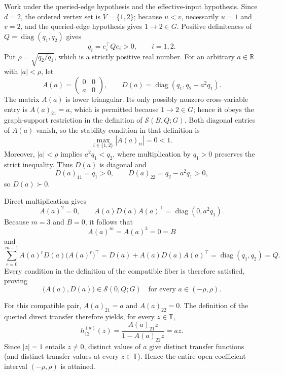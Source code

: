 Work under the queried-edge hypothesis and the effective-input hypothesis.  Since \(d=2\), the ordered vertex set is \(V=\{1,2\}\); because \(u<v\), necessarily \(u=1\) and \(v=2\), and the queried-edge hypothesis gives \(1\to2\in G\).  Positive definiteness of \(Q=\operatorname{diag}(q_1,q_2)\) gives
\[
q_i=e_i^{\top}Qe_i>0,\qquad i=1,2.
\]
Put \(\rho=\sqrt{q_2/q_1}\), which is a strictly positive real number.  For an arbitrary \(a\in\mathbb R\) with \(|a|<\rho\), let
\[
A(a)=\left(\begin{smallmatrix}0&0\\ a&0\end{smallmatrix}\right),
\qquad
D(a)=\operatorname{diag}(q_1,q_2-a^2q_1).
\]
The matrix \(A(a)\) is lower triangular.  Its only possibly nonzero cross-variable entry is \(A(a)_{21}=a\), which is permitted because \(1\to2\in G\); hence it obeys the graph-support restriction in the definition of \(\mathcal S(B,Q;G)\).  Both diagonal entries of \(A(a)\) vanish, so the stability condition in that definition is
\[
\max_{i\in\{1,2\}}|A(a)_{ii}|=0<1.
\]
Moreover, \(|a|<\rho\) implies \(a^2q_1<q_2\), where multiplication by \(q_1>0\) preserves the strict inequality.  Thus \(D(a)\) is diagonal and
\[
D(a)_{11}=q_1>0,
\qquad
D(a)_{22}=q_2-a^2q_1>0,
\]
so \(D(a)\succ0\).

Direct multiplication gives
\[
A(a)^2=0,
\qquad
A(a)D(a)A(a)^{\top}
=\operatorname{diag}(0,a^2q_1).
\]
Because \(m=3\) and \(B=0\), it follows that
\[
A(a)^m=A(a)^3=0=B
\]
and
\[
\sum_{r=0}^{m-1}A(a)^rD(a)\bigl(A(a)^r\bigr)^{\top}
=D(a)+A(a)D(a)A(a)^{\top}
=\operatorname{diag}(q_1,q_2)
=Q.
\]
Every condition in the definition of the compatible fiber is therefore satisfied, proving
\[
\bigl(A(a),D(a)\bigr)\in\mathcal S(0,Q;G)
\quad\text{for every }a\in(-\rho,\rho).
\]

For this compatible pair, \(A(a)_{21}=a\) and \(A(a)_{22}=0\).  The definition of the queried direct transfer therefore yields, for every \(z\in\mathbb T\),
\[
h_{12}^{(a)}(z)
=\frac{A(a)_{21}z}{1-A(a)_{22}z}
=az.
\]
Since \(|z|=1\) entails \(z\ne0\), distinct values of \(a\) give distinct transfer functions (and distinct transfer values at every \(z\in\mathbb T\)).  Hence the entire open coefficient interval \((-\rho,\rho)\) is attained.

